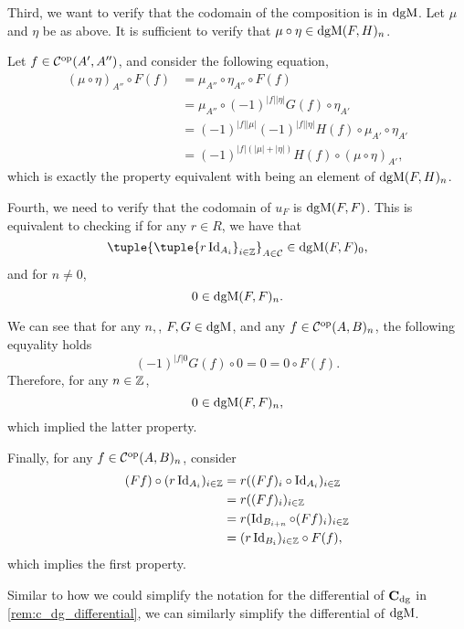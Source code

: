 \begin{remark}
    Third, we want to verify that the codomain of the composition is in \( \operatorname{dgM} \). Let \( \mu \) and \( \eta \) be as above. It is sufficient to verify that \( \mu \circ \eta \in \operatorname{dgM}(F, H)_n \).

    Let \( f \in {\mathcal{C}}^{\operatorname{op}}(A', A'') \), and consider the following equation,
    \begin{align*}
        (\mu \circ \eta)_{A''} \circ F(f) &= \mu_{A''} \circ \eta_{A''} \circ F(f) \\
        &= \mu_{A''} \circ (-1)^{|f||\eta|} G(f) \circ \eta_{A'} \\
        &= (-1)^{|f||\mu|}(-1)^{|f||\eta|} H(f) \circ \mu_{A'} \circ \eta_{A'} \\
        &= (-1)^{|f|(|\mu| + |\eta|)} H(f) \circ (\mu \circ \eta)_{A'},
    \end{align*}
    which is exactly the property equivalent with being an element of \( \operatorname{dgM}(F, H)_n \).

    Fourth, we need to verify that the codomain of \( u_F \) is \( \operatorname{dgM}(F, F) \). This is equivalent to checking if for any \( r \in R \), we have that
    \[
        \tuple{ \tuple{ r \Id_{A_i} }_{i \in \Zb} }_{A \in \Cc} \in \dgM(F, F)_0,
    \]
    and for \( n \neq 0 \),
    \[
        0 \in \operatorname{dgM}(F, F)_n.
    \]

    We can see that for any \( n, \), \( F, G \in \operatorname{dgM} \), and any \( f \in {\mathcal{C}}^{\operatorname{op}}(A, B)_n \), the following equyality holds
    \[
        (-1)^{|f|0}G(f) \circ 0 = 0 = 0 \circ F(f).
    \]
    Therefore, for any \( n \in {\mathbb{Z}} \),
    \[
        0 \in \operatorname{dgM}(F, F)_n,
    \]
    which implied the latter property.

    Finally, for any \( f \in {\mathcal{C}}^{\operatorname{op}}(A, B)_n \), consider
    \begin{align*}
        (F f) \circ (r \operatorname{Id}_{A_i})_{i \in {\mathbb{Z}}} &= r ((F f)_i \circ \operatorname{Id}_{A_i})_{i \in {\mathbb{Z}}} \\
        &= r ((F f)_i)_{i \in {\mathbb{Z}}} \\
        &= r (\operatorname{Id}_{B_{i + n}} \circ (F f)_i)_{i \in {\mathbb{Z}}} \\
        &= (r \operatorname{Id}_{B_i})_{i \in {\mathbb{Z}}} \circ F(f),
    \end{align*}
    which implies the first property.
\end{remark}

Similar to how we could simplify the notation for the differential of \( \operatorname{\mathbf{C}}_{\operatorname{dg}} \) in \autoref{rem:c_dg_differential}, we can similarly simplify the differential of \( \operatorname{dgM} \).

